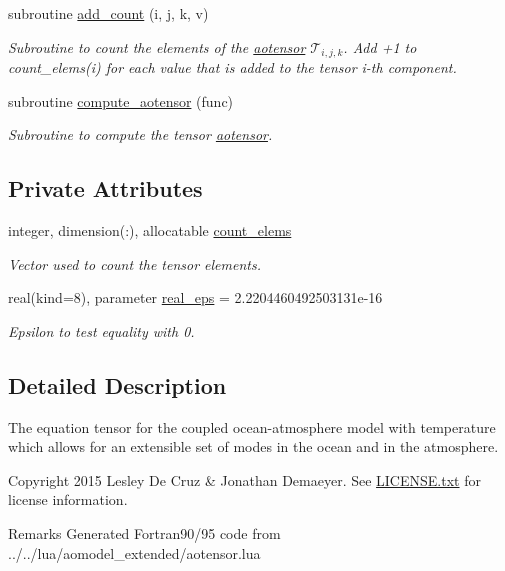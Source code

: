 \begin{DoxyCompactItemize}
subroutine \hyperlink{classaotensor__def_ac8104c190904681c1fd27eec036114aa}{add\-\_\-count} (i, j, k, v)
\begin{DoxyCompactList}\small\item\em Subroutine to count the elements of the \hyperlink{classaotensor__def_a0dc43bc9294a18f2fe57b67489f1702f}{aotensor} $\mathcal{T}_{i,j,k}$. Add +1 to count\-\_\-elems(i) for each value that is added to the tensor i-\/th component. \end{DoxyCompactList}\item 
subroutine \hyperlink{classaotensor__def_a3dfccbce01ca1616c616f855c0cfa45a}{compute\-\_\-aotensor} (func)
\begin{DoxyCompactList}\small\item\em Subroutine to compute the tensor \hyperlink{classaotensor__def_a0dc43bc9294a18f2fe57b67489f1702f}{aotensor}. \end{DoxyCompactList}\end{DoxyCompactItemize}
\subsection*{Private Attributes}
\begin{DoxyCompactItemize}
\item 
integer, dimension(\-:), allocatable \hyperlink{classaotensor__def_aa9e30c84efc5a81409ba9c0286c87eac}{count\-\_\-elems}
\begin{DoxyCompactList}\small\item\em Vector used to count the tensor elements. \end{DoxyCompactList}\item 
real(kind=8), parameter \hyperlink{classaotensor__def_ab1cf9313fb1def1a17de539cfa922e35}{real\-\_\-eps} = 2.\-2204460492503131e-\/16
\begin{DoxyCompactList}\small\item\em Epsilon to test equality with 0. \end{DoxyCompactList}\end{DoxyCompactItemize}


\subsection{Detailed Description}
The equation tensor for the coupled ocean-\/atmosphere model with temperature which allows for an extensible set of modes in the ocean and in the atmosphere. 

\begin{DoxyCopyright}{Copyright}
2015 Lesley De Cruz \& Jonathan Demaeyer. See \hyperlink{LICENSE_8txt}{L\-I\-C\-E\-N\-S\-E.\-txt} for license information. 
\end{DoxyCopyright}
\begin{DoxyRemark}{Remarks}
Generated Fortran90/95 code from ../../lua/aomodel\-\_\-extended/aotensor.lua 
\end{DoxyRemark}



